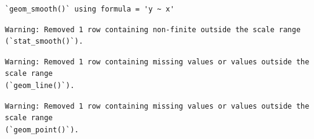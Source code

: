 \documentclass[
  letterpaper,
  DIV=11,
  numbers=noendperiod]{scrartcl}
\newenvironment{Shaded}{\begin{snugshade}}{\end{snugshade}}
\newcommand{\AttributeTok}[1]{\textcolor[rgb]{0.40,0.45,0.13}{#1}}
\newcommand{\ConstantTok}[1]{\textcolor[rgb]{0.56,0.35,0.01}{#1}}
\newcommand{\DecValTok}[1]{\textcolor[rgb]{0.68,0.00,0.00}{#1}}
\newcommand{\FloatTok}[1]{\textcolor[rgb]{0.68,0.00,0.00}{#1}}
\newcommand{\FunctionTok}[1]{\textcolor[rgb]{0.28,0.35,0.67}{#1}}
\newcommand{\NormalTok}[1]{\textcolor[rgb]{0.00,0.23,0.31}{#1}}
\newcommand{\SpecialCharTok}[1]{\textcolor[rgb]{0.37,0.37,0.37}{#1}}
\newcommand{\StringTok}[1]{\textcolor[rgb]{0.13,0.47,0.30}{#1}}
\begin{document}
\begin{Shaded}
\end{Shaded}

\begin{verbatim}
`geom_smooth()` using formula = 'y ~ x'
\end{verbatim}

\begin{verbatim}
Warning: Removed 1 row containing non-finite outside the scale range
(`stat_smooth()`).
\end{verbatim}

\begin{verbatim}
Warning: Removed 1 row containing missing values or values outside the scale range
(`geom_line()`).
\end{verbatim}

\begin{verbatim}
Warning: Removed 1 row containing missing values or values outside the scale range
(`geom_point()`).
\end{verbatim}
\end{document}
